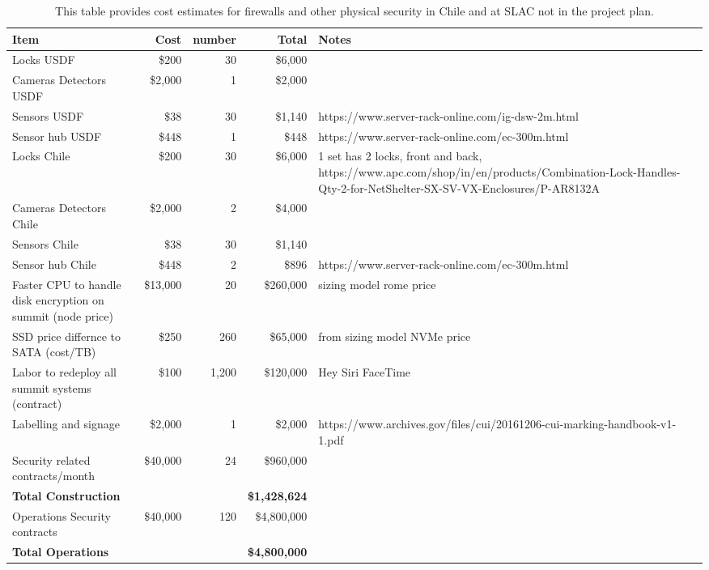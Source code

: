 \tiny \begin{longtable} {|p{}|r|r|r|p{}|} \caption{This table provides cost estimates for firewalls and other physical security in Chile and at SLAC not in the project plan. \label{tab:firewalls}}\\ 
\hline 
\textbf{Item}&\textbf{Cost}&\textbf{number}&\textbf{Total}&\textbf{Notes} \\ \hline
{Locks USDF}&{\$200}&{30}&{\$6,000}& \\ \hline
{Cameras Detectors  USDF}&{\$2,000}&{1}&{\$2,000}& \\ \hline
{Sensors USDF}&{\$38}&{30}&{\$1,140}&{ https://www.server-rack-online.com/ig-dsw-2m.html} \\ \hline
{Sensor hub USDF}&{\$448}&{1}&{\$448}&{https://www.server-rack-online.com/ec-300m.html} \\ \hline
{Locks Chile}&{\$200}&{30}&{\$6,000}&{1 set has 2 locks, front and back, https://www.apc.com/shop/in/en/products/Combination-Lock-Handles-Qty-2-for-NetShelter-SX-SV-VX-Enclosures/P-AR8132A} \\ \hline
{Cameras Detectors Chile}&{\$2,000}&{2}&{\$4,000}& \\ \hline
{Sensors Chile}&{\$38}&{30}&{\$1,140}& \\ \hline
{Sensor hub Chile}&{\$448}&{2}&{\$896}&{https://www.server-rack-online.com/ec-300m.html} \\ \hline
{Faster CPU to handle disk encryption on summit (node price)}&{\$13,000}&{20}&{\$260,000}&{sizing model rome price} \\ \hline
{SSD price differnce to SATA (cost/TB)}&{\$250}&{260}&{\$65,000}&{from sizing model NVMe price} \\ \hline
{Labor to redeploy all summit systems (contract)}&{\$100}&{1,200}&{\$120,000}&{Hey Siri FaceTime} \\ \hline
{Labelling and signage }&{\$2,000}&{1}&{\$2,000}&{https://www.archives.gov/files/cui/20161206-cui-marking-handbook-v1-1.pdf} \\ \hline
{Security related contracts/month}&{\$40,000}&{24}&{\$960,000}& \\ \hline
\textbf{Total Construction}&\textbf{}&\textbf{}&\textbf{\$1,428,624}& \\ \hline
{Operations Security contracts}&{\$40,000}&{120}&{\$4,800,000}& \\ \hline
\textbf{Total Operations}&\textbf{}&\textbf{}&\textbf{\$4,800,000}& \\ \hline
\end{longtable} \normalsize
